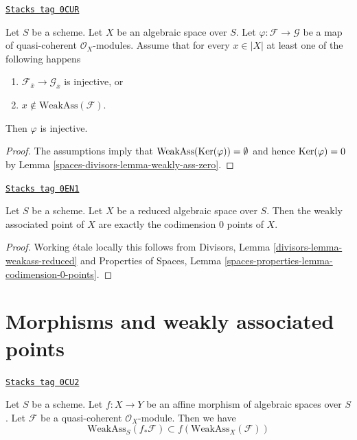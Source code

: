 \begin{lemma}
\label{spaces-divisors-lemma-check-injective-on-weakass}
\href{https://stacks.math.columbia.edu/tag/0CUR}{\texttt{Stacks tag 0CUR}}

Let $S$ be a scheme. Let $X$ be an algebraic space over $S$.
Let $\varphi : \mathcal{F} \to \mathcal{G}$ be a map of
quasi-coherent $\mathcal{O}_X$-modules. Assume that for every
$x \in |X|$ at least one of the following happens
\begin{enumerate}
\item $\mathcal{F}_{\overline{x}} \to \mathcal{G}_{\overline{x}}$
is injective, or
\item $x \not \in \text{WeakAss}(\mathcal{F})$.
\end{enumerate}
Then $\varphi$ is injective.
\end{lemma}

\begin{proof}
The assumptions imply that $\text{WeakAss}(\operatorname{Ker}(\varphi)) = \emptyset$
and hence $\operatorname{Ker}(\varphi) = 0$ by Lemma \ref{spaces-divisors-lemma-weakly-ass-zero}.
\end{proof}

\begin{lemma}
\label{spaces-divisors-lemma-weakass-reduced}
\href{https://stacks.math.columbia.edu/tag/0EN1}{\texttt{Stacks tag 0EN1}}

Let $S$ be a scheme. Let $X$ be a reduced algebraic space over $S$.
Then the weakly associated point of $X$ are exactly the codimension $0$
points of $X$.
\end{lemma}

\begin{proof}
Working \'etale locally this follows from
Divisors, Lemma \ref{divisors-lemma-weakass-reduced}
and
Properties of Spaces, Lemma \ref{spaces-properties-lemma-codimension-0-points}.
\end{proof}

\section{Morphisms and weakly associated points}
\label{spaces-divisors-section-morphisms-weakly-associated}
\begin{lemma}
\label{spaces-divisors-lemma-weakly-ass-reverse-functorial}
\href{https://stacks.math.columbia.edu/tag/0CU2}{\texttt{Stacks tag 0CU2}}

Let $S$ be a scheme.
Let $f : X \to Y$ be an affine morphism of algebraic spaces over $S$.
Let $\mathcal{F}$ be a quasi-coherent $\mathcal{O}_X$-module.
Then we have
$$
\text{WeakAss}_S(f_*\mathcal{F}) \subset f(\text{WeakAss}_X(\mathcal{F}))
$$
\end{lemma}

